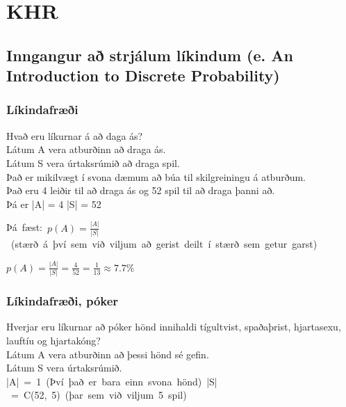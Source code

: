 \section{KHR}
\vspace*{-0.4em}
\subsection{Inngangur að strjálum líkindum (e. An Introduction to Discrete Probability) }
\subsubsection{Líkindafræði}
\vspace*{-0.4em}
Hvað eru líkurnar á að daga ás?\vspace*{0.5em}\\
Látum A vera atburðinn að draga ás.\\
Látum S vera úrtaksrúmið að draga spil.\\
Það er mikilvægt í svona dæmum að búa til skilgreiningu á atburðum.\vspace*{0.5em}\\
Það eru 4 leiðir til að draga ás og 52 spil til að draga þanni að.\\
Þá er |A| = 4 \quad |S| = 52\vspace*{0.5em}

\hbox{Þá fæst: $p(A) = \frac{ |A| }{ |S| }$ (stærð á því sem við viljum að gerist deilt í stærð sem getur garst)}\vspace*{0.5em}

$p(A) = \frac{ |A| }{ |S| } = \frac{4}{52} = \frac{1}{13}\approx 7.7\%$
\vspace*{-0.4em}
\subsubsection{Líkindafræði, póker}
\vspace*{-0.4em}
Hverjar eru líkurnar að póker hönd innihaldi tígultvist, spaðaþrist, hjartasexu, lauftíu og hjartakóng?\vspace*{0.5em}\\
Látum A vera atburðinn að þessi hönd sé gefin.\\
Látum S vera úrtaksrúmið.\\
\hbox{|A| = 1 (Því það er bara einn svona hönd) \quad |S| = C(52, 5) (þar sem við viljum 5 spil)}\vspace*{0.5em}

